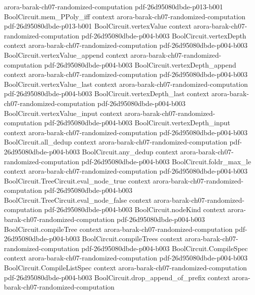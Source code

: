 \begin{theorem}
  {arora-barak-ch07-randomized-computation}
  {pdf-26d95080dbde-p013-b001}
\proofstep
  {BoolCircuit.mem_PPoly_iff}
  {context}
  {arora-barak-ch07-randomized-computation}
  {pdf-26d95080dbde-p013-b001}
\proofstep
  {BoolCircuit.vertexValue}
  {context}
  {arora-barak-ch07-randomized-computation}
  {pdf-26d95080dbde-p004-b003}
\proofstep
  {BoolCircuit.vertexDepth}
  {context}
  {arora-barak-ch07-randomized-computation}
  {pdf-26d95080dbde-p004-b003}
\proofstep
  {BoolCircuit.vertexValue_append}
  {context}
  {arora-barak-ch07-randomized-computation}
  {pdf-26d95080dbde-p004-b003}
\proofstep
  {BoolCircuit.vertexDepth_append}
  {context}
  {arora-barak-ch07-randomized-computation}
  {pdf-26d95080dbde-p004-b003}
\proofstep
  {BoolCircuit.vertexValue_last}
  {context}
  {arora-barak-ch07-randomized-computation}
  {pdf-26d95080dbde-p004-b003}
\proofstep
  {BoolCircuit.vertexDepth_last}
  {context}
  {arora-barak-ch07-randomized-computation}
  {pdf-26d95080dbde-p004-b003}
\proofstep
  {BoolCircuit.vertexValue_input}
  {context}
  {arora-barak-ch07-randomized-computation}
  {pdf-26d95080dbde-p004-b003}
\proofstep
  {BoolCircuit.vertexDepth_input}
  {context}
  {arora-barak-ch07-randomized-computation}
  {pdf-26d95080dbde-p004-b003}
\proofstep
  {BoolCircuit.all_dedup}
  {context}
  {arora-barak-ch07-randomized-computation}
  {pdf-26d95080dbde-p004-b003}
\proofstep
  {BoolCircuit.any_dedup}
  {context}
  {arora-barak-ch07-randomized-computation}
  {pdf-26d95080dbde-p004-b003}
\proofstep
  {BoolCircuit.foldr_max_le}
  {context}
  {arora-barak-ch07-randomized-computation}
  {pdf-26d95080dbde-p004-b003}
\proofstep
  {BoolCircuit.TreeCircuit.eval_node_true}
  {context}
  {arora-barak-ch07-randomized-computation}
  {pdf-26d95080dbde-p004-b003}
\proofstep
  {BoolCircuit.TreeCircuit.eval_node_false}
  {context}
  {arora-barak-ch07-randomized-computation}
  {pdf-26d95080dbde-p004-b003}
\proofstep
  {BoolCircuit.nodeKind}
  {context}
  {arora-barak-ch07-randomized-computation}
  {pdf-26d95080dbde-p004-b003}
\proofstep
  {BoolCircuit.compileTree}
  {context}
  {arora-barak-ch07-randomized-computation}
  {pdf-26d95080dbde-p004-b003}
\proofstep
  {BoolCircuit.compileTrees}
  {context}
  {arora-barak-ch07-randomized-computation}
  {pdf-26d95080dbde-p004-b003}
\proofstep
  {BoolCircuit.CompileSpec}
  {context}
  {arora-barak-ch07-randomized-computation}
  {pdf-26d95080dbde-p004-b003}
\proofstep
  {BoolCircuit.CompileListSpec}
  {context}
  {arora-barak-ch07-randomized-computation}
  {pdf-26d95080dbde-p004-b003}
\proofstep
  {BoolCircuit.drop_append_of_prefix}
  {context}
  {arora-barak-ch07-randomized-computation}

\end{theorem}
